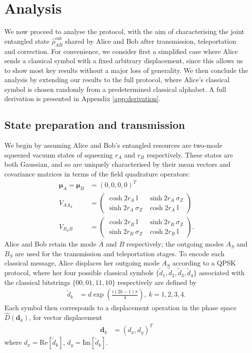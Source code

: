 \documentclass[%
 reprint,
 superscriptaddress,
 amsmath,
 amssymb,
 aps,
 pra,
]{revtex4-2}
\newcommand{\id}{\mathbb{I}}
\newcommand{\sz}{\sigma_Z}
\begin{document}
\section{Analysis} \label{sec:analysis}
We now proceed to analyse the protocol, with the aim of characterising the joint entangled state $\hat \rho_{AB}^\mathrm{out}$ shared by Alice and Bob after transmission, teleportation and correction. For convenience, we consider first a simplified case where Alice sends a classical symbol with a fixed arbitrary displacement, since this allows us to show most key results without a major loss of generality. We then conclude the analysis by extending our results to the full protocol, where Alice's classical symbol is chosen randomly from a predetermined classical alphabet. A full derivation is presented in Appendix \ref{app:derivation}.

\subsection{State preparation and transmission}
We begin by assuming Alice and Bob's entangled resources are two-mode squeezed vacuum states of squeezing $r_A$ and $r_B$ respectively. These states are both Gaussian, and so are uniquely characterised by their mean vectors and covariance matrices in terms of the field quadrature operators:
\begin{align}
    \bm{\mu}_{A} = \bm{\mu}_{B} &= (0, 0, 0, 0)^T \\
    V_{AA_S} &= \begin{pmatrix}
        \cosh 2r_A \ \id & \sinh2r_A \ \sz \\
        \sinh2r_A \ \sz & \cosh2r_A \ \id
    \end{pmatrix} \\
    V_{B_SB} &= \begin{pmatrix}
        \cosh 2r_B \ \id & \sinh2r_B \ \sz \\
        \sinh2r_B \ \sz & \cosh2r_B \ \id
    \end{pmatrix}.
\end{align}
Alice and Bob retain the mode $A$ and $B$ respectively; the outgoing modes $A_S$ and $B_S$ are used for the transmission and teleportation stages. To encode each classical message, Alice displaces her outgoing mode $A_S$ according to a QPSK protocol, where her four possible classical symbols $\{ \tilde d_1, \tilde d_2, \tilde d_3, \tilde d_4 \}$ associated with the classical bitstrings $\{00, 01, 11, 10\}$ respectively are defined by
\begin{align}
    \tilde d_k &= d \exp\left( \frac{i(2k-1)\pi}{4} \right), \ k = 1,2,3,4.
\end{align}
Each symbol then corresponds to a displacement operation in the phase space $\hat D(\bm{d}_k)$, for vector displacement
\begin{align}
    \bm{d}_k &= \left( d_x, d_y \right)^T
\end{align}
where $d_x = \mathrm{Re}[\tilde d_k]$, $d_y = \mathrm{Im}[\tilde d_k]$. 
\end{document}
